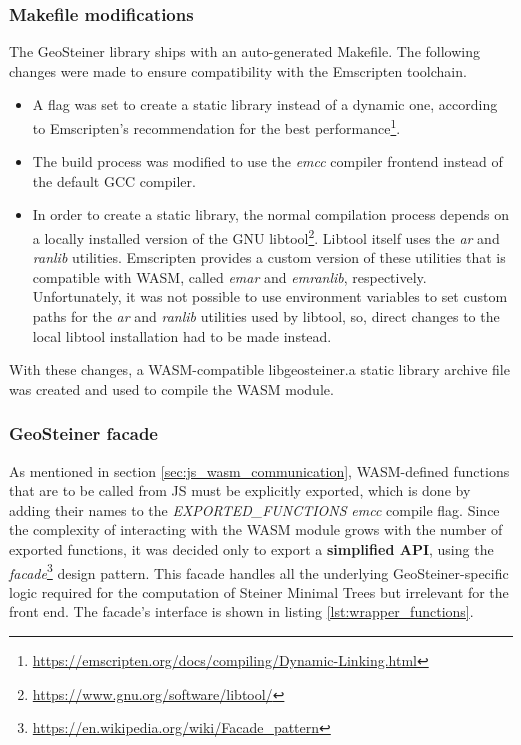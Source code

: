 \documentclass{l4proj}
\begin{document}
\subsubsection{Makefile modifications}
The GeoSteiner library ships with an auto-generated Makefile. The following changes were made to ensure compatibility with the Emscripten toolchain.
\begin{itemize}
    \item A flag was set to create a static library instead of a dynamic one, according to Emscripten's recommendation for the best performance\footnote{\url{https://emscripten.org/docs/compiling/Dynamic-Linking.html}}.
    \item The build process was modified to use the \textit{emcc} compiler frontend instead of the default GCC compiler.
    \item In order to create a static library, the normal compilation process depends on a locally installed version of the GNU libtool\footnote{\url{https://www.gnu.org/software/libtool/}}. Libtool itself uses the \textit{ar} and \textit{ranlib} utilities. Emscripten provides a custom version of these utilities that is compatible with WASM, called \textit{emar} and \textit{emranlib}, respectively. Unfortunately, it was not possible to use environment variables to set custom paths for the \textit{ar} and \textit{ranlib} utilities used by libtool, so, direct changes to the local libtool installation had to be made instead.
\end{itemize}

With these changes, a WASM-compatible libgeosteiner.a static library archive file was created and used to compile the WASM module.

\subsubsection{GeoSteiner facade}
As mentioned in section \ref{sec:js_wasm_communication}, WASM-defined functions that are to be called from JS must be explicitly exported, which is done by adding their names to the \textit{EXPORTED\_FUNCTIONS} \textit{emcc} compile flag.
Since the complexity of interacting with the WASM module grows with the number of exported functions, it was decided only to export a \textbf{simplified API}, using the \textit{facade}\footnote{\url{https://en.wikipedia.org/wiki/Facade\_pattern}} design pattern. This facade handles all the underlying GeoSteiner-specific logic required for the computation of Steiner Minimal Trees but irrelevant for the front end. The facade's interface is shown in listing \ref{lst:wrapper_functions}.
\end{document}
